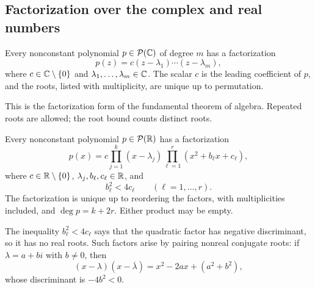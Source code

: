 \subsection{Factorization over the complex and real numbers}

\begin{theorem}
  \label{thm:complex-polynomial-factorization}
  Every nonconstant polynomial $p\in\mathcal P(\mathbb{C})$ of degree
  $m$ has a factorization
  \[
    p(z)=c(z-\lambda_1)\cdots(z-\lambda_m),
  \]
  where $c\in\mathbb{C}\setminus\{0\}$ and
  $\lambda_1,\ldots,\lambda_m\in\mathbb{C}$. The scalar $c$ is the
  leading coefficient of $p$, and the roots, listed with
  multiplicity, are unique up to permutation.
\end{theorem}

This is the factorization form of the fundamental theorem of algebra.
Repeated roots are allowed; the root bound counts distinct roots.

\begin{theorem}
  \label{thm:real-polynomial-factorization}
  Every nonconstant polynomial $p\in\mathcal P(\mathbb{R})$ has a
  factorization
  \[
    p(x)=c\prod_{j=1}^{k}(x-\lambda_j)
      \prod_{\ell=1}^{r}(x^2+b_\ell x+c_\ell),
  \]
  where $c\in\mathbb{R}\setminus\{0\}$,
  $\lambda_j,b_\ell,c_\ell\in\mathbb{R}$, and
  \[
    b_\ell^2<4c_\ell\qquad(\ell=1,\ldots,r).
  \]
  The factorization is unique up to reordering the factors, with
  multiplicities included, and $\deg p=k+2r$. Either product may
  be empty.
\end{theorem}

The inequality $b_\ell^2<4c_\ell$ says that the quadratic factor
has negative discriminant, so it has no real roots. Such factors
arise by pairing nonreal conjugate roots: if $\lambda=a+bi$ with
$b\neq0$, then
\[
  (x-\lambda)(x-\overline\lambda)
    =x^2-2ax+(a^2+b^2),
\]
whose discriminant is $-4b^2<0$.
